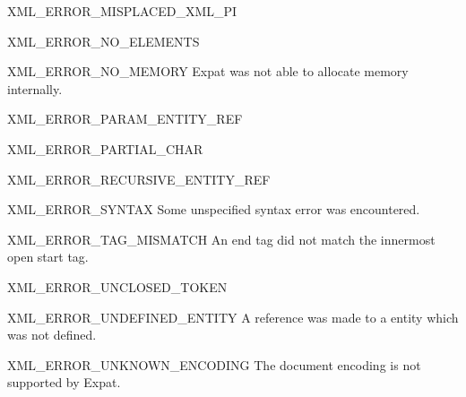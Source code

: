 \begin{datadesc}{XML_ERROR_MISPLACED_XML_PI}
\end{datadesc}

\begin{datadesc}{XML_ERROR_NO_ELEMENTS}
\end{datadesc}

\begin{datadesc}{XML_ERROR_NO_MEMORY}
Expat was not able to allocate memory internally.
\end{datadesc}

\begin{datadesc}{XML_ERROR_PARAM_ENTITY_REF}
\end{datadesc}

\begin{datadesc}{XML_ERROR_PARTIAL_CHAR}
\end{datadesc}

\begin{datadesc}{XML_ERROR_RECURSIVE_ENTITY_REF}
\end{datadesc}

\begin{datadesc}{XML_ERROR_SYNTAX}
Some unspecified syntax error was encountered.
\end{datadesc}

\begin{datadesc}{XML_ERROR_TAG_MISMATCH}
An end tag did not match the innermost open start tag.
\end{datadesc}

\begin{datadesc}{XML_ERROR_UNCLOSED_TOKEN}
\end{datadesc}

\begin{datadesc}{XML_ERROR_UNDEFINED_ENTITY}
A reference was made to a entity which was not defined.
\end{datadesc}

\begin{datadesc}{XML_ERROR_UNKNOWN_ENCODING}
The document encoding is not supported by Expat.
\end{datadesc}
